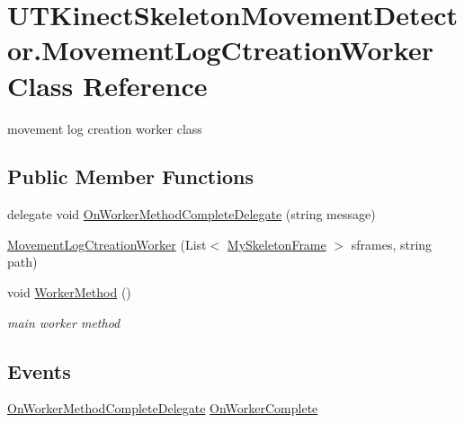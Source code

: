 \hypertarget{class_u_t_kinect_skeleton_movement_detector_1_1_movement_log_ctreation_worker}{\section{U\-T\-Kinect\-Skeleton\-Movement\-Detector.\-Movement\-Log\-Ctreation\-Worker Class Reference}
\label{class_u_t_kinect_skeleton_movement_detector_1_1_movement_log_ctreation_worker}
}


movement log creation worker class  


\subsection*{Public Member Functions}
\begin{DoxyCompactItemize}
\item 
delegate void \hyperlink{class_u_t_kinect_skeleton_movement_detector_1_1_movement_log_ctreation_worker_a812bd166505941b61f4c4d33345bd1f5}{On\-Worker\-Method\-Complete\-Delegate} (string message)
\item 
\hyperlink{class_u_t_kinect_skeleton_movement_detector_1_1_movement_log_ctreation_worker_aff1e02f238a10168e4c24468911a37f0}{Movement\-Log\-Ctreation\-Worker} (List$<$ \hyperlink{class_u_t_kinect_skeleton_movement_detector_1_1_my_skeleton_frame}{My\-Skeleton\-Frame} $>$ sframes, string path)
\item 
void \hyperlink{class_u_t_kinect_skeleton_movement_detector_1_1_movement_log_ctreation_worker_a22e7b14a025767fd5bbe00e5e921fbb1}{Worker\-Method} ()
\begin{DoxyCompactList}\small\item\em main worker method \end{DoxyCompactList}\end{DoxyCompactItemize}
\subsection*{Events}
\begin{DoxyCompactItemize}
\item 
\hyperlink{class_u_t_kinect_skeleton_movement_detector_1_1_movement_log_ctreation_worker_a812bd166505941b61f4c4d33345bd1f5}{On\-Worker\-Method\-Complete\-Delegate} \hyperlink{class_u_t_kinect_skeleton_movement_detector_1_1_movement_log_ctreation_worker_a9602a7bd07fa4db7c977303e6b25e4ec}{On\-Worker\-Complete}
\end{DoxyCompactItemize}


